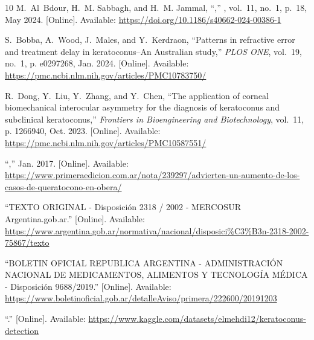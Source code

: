 \begin{thebibliography}{10}
\BIBentryALTinterwordspacing
M.~Al~Bdour, H.~M. Sabbagh, and H.~M. Jammal,
  ``,'' \emph{}, vol.~11, no.~1, p.~18, May 2024. [Online]. Available:
  \url{https://doi.org/10.1186/s40662-024-00386-1}
\BIBentrySTDinterwordspacing

\BIBentryALTinterwordspacing
S.~Bobba, A.~Wood, J.~Males, and Y.~Kerdraon, ``Patterns in refractive error
  and treatment delay in keratoconus–{An} {Australian} study,'' \emph{PLOS
  ONE}, vol.~19, no.~1, p. e0297268, Jan. 2024. [Online]. Available:
  \url{https://pmc.ncbi.nlm.nih.gov/articles/PMC10783750/}
\BIBentrySTDinterwordspacing

\BIBentryALTinterwordspacing
R.~Dong, Y.~Liu, Y.~Zhang, and Y.~Chen, ``The application of corneal
  biomechanical interocular asymmetry for the diagnosis of keratoconus and
  subclinical keratoconus,'' \emph{Frontiers in Bioengineering and
  Biotechnology}, vol.~11, p. 1266940, Oct. 2023. [Online]. Available:
  \url{https://pmc.ncbi.nlm.nih.gov/articles/PMC10587551/}
\BIBentrySTDinterwordspacing

\BIBentryALTinterwordspacing
``,'' Jan. 2017. [Online]. Available:
  \url{https://www.primeraedicion.com.ar/nota/239297/advierten-un-aumento-de-los-casos-de-queratocono-en-obera/}
\BIBentrySTDinterwordspacing

\BIBentryALTinterwordspacing
``{TEXTO} {ORIGINAL} - {Disposición} 2318 / 2002 - {MERCOSUR} {\textbar}
  {Argentina}.gob.ar.'' [Online]. Available:
  \url{https://www.argentina.gob.ar/normativa/nacional/disposici%C3%B3n-2318-2002-75867/texto}
\BIBentrySTDinterwordspacing

\BIBentryALTinterwordspacing
``{BOLETIN} {OFICIAL} {REPUBLICA} {ARGENTINA} - {ADMINISTRACIÓN} {NACIONAL}
  {DE} {MEDICAMENTOS}, {ALIMENTOS} {Y} {TECNOLOGÍA} {MÉDICA} - {Disposición}
  9688/2019.'' [Online]. Available:
  \url{https://www.boletinoficial.gob.ar/detalleAviso/primera/222600/20191203}
\BIBentrySTDinterwordspacing

\BIBentryALTinterwordspacing
``.'' [Online]. Available:
  \url{https://www.kaggle.com/datasets/elmehdi12/keratoconus-detection}
\BIBentrySTDinterwordspacing


\end{thebibliography}
